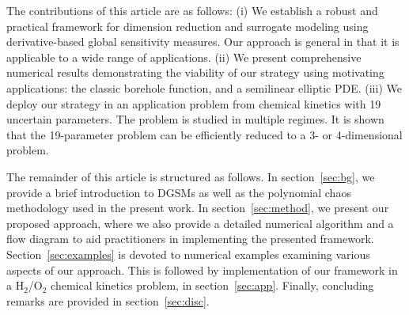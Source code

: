 
The contributions of this article are as follows: (i) We establish a robust and
practical framework for dimension reduction and surrogate modeling using
derivative-based global sensitivity measures. Our
approach is general in that it is applicable to a wide range of applications.
(ii) We present comprehensive numerical results demonstrating the viability of
our strategy using motivating applications: the classic borehole
function, and a semilinear elliptic PDE.  (iii) We 
deploy our strategy in an application problem from chemical kinetics with 19
uncertain parameters. The problem is studied in multiple regimes.
It is shown that the 19-parameter problem can be efficiently reduced to a 3- 
or 4-dimensional problem.

The remainder of this article is structured as follows. 
In section~\ref{sec:bg}, we provide a
brief introduction to DGSMs as well as the polynomial chaos methodology used in
the present work.  In section~\ref{sec:method}, we present our proposed
approach, where we also provide a detailed numerical algorithm and a flow
diagram to aid practitioners in implementing the presented framework.
Section~\ref{sec:examples} is devoted to numerical examples
examining various aspects of our approach. This is followed by implementation
of our framework in a H$_2$/O$_2$ chemical kinetics problem, in section~\ref{sec:app}.
Finally, concluding remarks are provided in section~\ref{sec:disc}.






